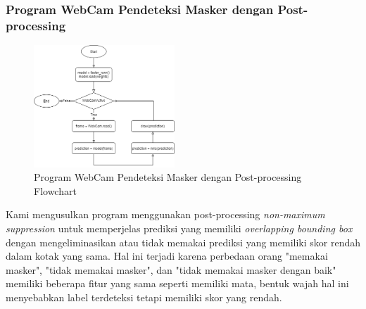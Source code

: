 \documentclass{article}
\begin{document}
  	\subsubsection{Program WebCam Pendeteksi Masker dengan Post-processing}
  	\begin{figure}[H]
  		\centering
  		\includegraphics[width=200px]{arsitektur/Sequential with Postprocessing.png}
  		\caption{Program WebCam Pendeteksi Masker dengan Post-processing Flowchart}
	\end{figure}
	
	Kami mengusulkan program menggunakan post-processing \textit{non-maximum suppression} \cite{nms_pytorch} untuk memperjelas prediksi yang memiliki \textit{overlapping bounding box} dengan mengeliminasikan atau tidak memakai prediksi yang memiliki skor rendah dalam kotak yang sama. Hal ini terjadi karena perbedaan orang "memakai masker", "tidak memakai masker", dan "tidak memakai masker dengan baik" memiliki beberapa fitur yang sama seperti memiliki mata, bentuk wajah hal ini menyebabkan label terdeteksi tetapi memiliki skor yang rendah.\\
\end{document}
